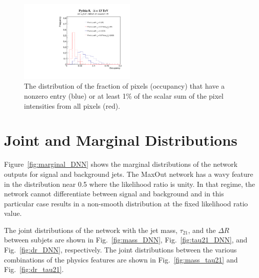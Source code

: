 \documentclass{article}
\begin{document}
\begin{figure}[htbp!]
  \begin{center}
        \includegraphics[width=0.5\textwidth]{figures/occ.pdf}
      \caption{ The distribution of the fraction of pixels (occupancy) that have a nonzero entry (blue) or at least 1\% of the scalar sum of the pixel intensities from all pixels (red).
      \label{fig:occupancy} }
    \end{center}
\end{figure}

\clearpage
\newpage

\section{Joint and Marginal Distributions}
\label{sec:app:dists}

Figure~\ref{fig:marginal_DNN} shows the marginal distributions of the network outputs for signal and background jets.  The MaxOut network has a wavy feature in the distribution near 0.5 where the likelihood ratio is unity.  In that regime, the network cannot differentiate between signal and background and in this particular case results in a non-smooth distribution at the fixed likelihood ratio value.

The joint distributions of the network with the jet mass, $\tau_{21}$, and the $\Delta R$ between subjets are shown in Fig.~\ref{fig:mass_DNN}, Fig.~\ref{fig:tau21_DNN}, and Fig.~\ref{fig:dr_DNN}, respectively.  The joint distributions between the various combinations of the physics features are shown in Fig.~\ref{fig:mass_tau21} and Fig.~\ref{fig:dr_tau21}.
\end{document}
